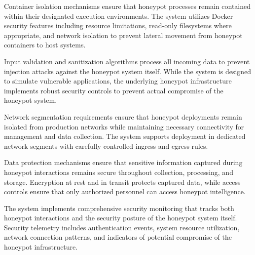 Container isolation mechanisms ensure that honeypot processes remain contained within their designated execution environments. The system utilizes Docker security features including resource limitations, read-only filesystems where appropriate, and network isolation to prevent lateral movement from honeypot containers to host systems.

Input validation and sanitization algorithms process all incoming data to prevent injection attacks against the honeypot system itself. While the system is designed to simulate vulnerable applications, the underlying honeypot infrastructure implements robust security controls to prevent actual compromise of the honeypot system.

Network segmentation requirements ensure that honeypot deployments remain isolated from production networks while maintaining necessary connectivity for management and data collection. The system supports deployment in dedicated network segments with carefully controlled ingress and egress rules.

Data protection mechanisms ensure that sensitive information captured during honeypot interactions remains secure throughout collection, processing, and storage. Encryption at rest and in transit protects captured data, while access controls ensure that only authorized personnel can access honeypot intelligence.

The system implements comprehensive security monitoring that tracks both honeypot interactions and the security posture of the honeypot system itself. Security telemetry includes authentication events, system resource utilization, network connection patterns, and indicators of potential compromise of the honeypot infrastructure.